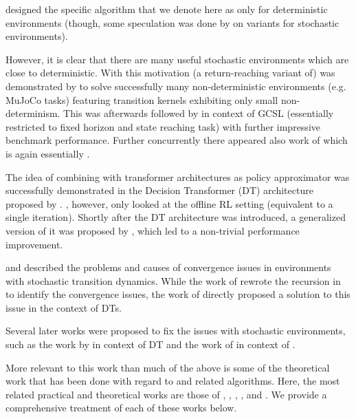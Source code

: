\citet{schmidhuber2019reinforcement} designed the specific algorithm
that we denote here as \eUDRL{} only for deterministic environments
(though, some speculation was done by \citet{schmidhuber2019reinforcement} on variants for stochastic environments).

However, it is clear that there are many useful stochastic
environments which are close to deterministic.
With this motivation (a return-reaching variant of) \eUDRL{} was
demonstrated by \cite{srivastava2019training} to solve successfully many non-deterministic environments (e.g. MuJoCo tasks) featuring transition kernels exhibiting only small non-determinism.
This was afterwards followed by \cite{ghosh2021learning}
in context of GCSL (essentially \eUDRL{} restricted to fixed horizon and state reaching task) with further impressive benchmark performance.
Further concurrently there appeared also work of \cite{kumar2019reward}
which is again essentially \eUDRL{}.

The idea of combining \eUDRL{} with transformer architectures \cite{schmidhuber1992learningFWP,vaswani2017attention,schlag2021linear} as policy approximator was successfully demonstrated in the Decision Transformer (DT) architecture proposed by \citet{chen2021decision}.
\citet{chen2021decision}, however, only looked at the offline RL setting (equivalent to a single \eUDRL{} iteration).
Shortly after the DT architecture was introduced, a generalized version of it was proposed by \citet{furuta2021generalized}, which led to a non-trivial performance improvement.

\citet{strupl2022upsidedown} and \citet{paster2022cant}
described the problems and causes of \eUDRL{} convergence issues 
in environments with stochastic transition dynamics.
While the work of \cite{strupl2022upsidedown} rewrote the recursion in \eUDRL{} to identify the convergence issues,
the work of \cite{paster2022cant} directly proposed a solution to this issue in the context of DTs.

Several later works were proposed to fix the issues with \eUDRL{} stochastic environments, such as the work by \citet{yang2022dichotomy} in context of DT and 
the work of \citet{faccio2023goal} in context of \eUDRL{}.

More relevant to this work than much of the above is some of the theoretical work that has been done with regard to \eUDRL{} and related algorithms.
Here, the most related practical and theoretical works are those of
\citet{brandfonbrener2023does},
\citet{ghosh2021learning},
\citet{kumar2019reward},
\citet{andrychowicz2017hindsight}, and
\cite{paster2022cant}.
We provide a comprehensive treatment of each of these works below.

